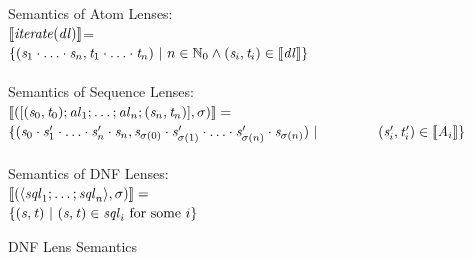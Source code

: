 \documentclass[numbers]{sigplanconf}
\begin{document}
\begin{figure}
Semantics of Atom Lenses:\\
$[ \! [\mathit{iterate(\mathit{dl})}] \! ]$=\\
\hspace*{3em}$\{(\mathit{s}_1\cdot\ldots\cdot\mathit{s}_n,
\mathit{t}_1\cdot\ldots\cdot\mathit{t}_n)~|~
n\in\mathbb{N}_0\wedge(\mathit{s}_i,\mathit{t}_i)\in[ \! [\mathit{dl}] \! ]\}$\\
\\
Semantics of Sequence Lenses:\\
$[ \! [([(\mathit{s}_0,\mathit{t}_0);
\mathit{al}_1;\ldots;\mathit{al}_n
;(\mathit{s}_n,\mathit{t}_n)],\sigma)] \! ]=$\\
\hspace*{3em}$\SetOf{
(\String_0\Concat\String_1'\Concat\ldots\Concat\String_n'\Concat\String_n,
\String_{\Permutation(0)}\Concat\String_{\Permutation(1)}'\Concat\ldots
\Concat\String_{\Permutation(n)}'\Concat\String_{\Permutation(n)})\SuchThat$\\
\hspace*{4em}$(\String_i',\StringAlt_i')\in\SemanticsOf{\Atom_i}}$\\
\\
Semantics of DNF Lenses:\\
$[ \! [(\langle\mathit{sql}_1;\ldots;
\mathit{sql}_n\rangle,\sigma)] \! ]=$\\
\hspace*{3em}$\{(\mathit{s},\mathit{t})~|~
(\mathit{s},\mathit{t})\in\mathit{sql}_i\text{ for some $i$}\}$
\caption{DNF Lens Semantics}
\label{fig:dnf-lens-semantics}
\end{figure}
\end{document}
